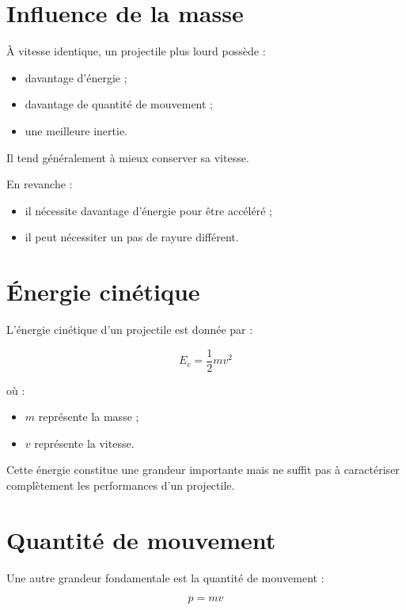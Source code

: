 \section{Influence de la masse}

À vitesse identique, un projectile plus lourd possède :

\begin{itemize}
    \item davantage d'énergie ;
    \item davantage de quantité de mouvement ;
    \item une meilleure inertie.
\end{itemize}

Il tend généralement à mieux conserver sa vitesse.

En revanche :

\begin{itemize}
    \item il nécessite davantage d'énergie pour être accéléré ;
    \item il peut nécessiter un pas de rayure différent.
\end{itemize}

\section{Énergie cinétique}

L'énergie cinétique d'un projectile est donnée par :

\begin{equation}
E_c = \frac{1}{2}mv^2
\end{equation}

où :

\begin{itemize}
    \item $m$ représente la masse ;
    \item $v$ représente la vitesse.
\end{itemize}

Cette énergie constitue une grandeur importante mais ne suffit pas à
caractériser complètement les performances d'un projectile.

\section{Quantité de mouvement}

Une autre grandeur fondamentale est la quantité de mouvement :

\begin{equation}
p = mv
\end{equation}

